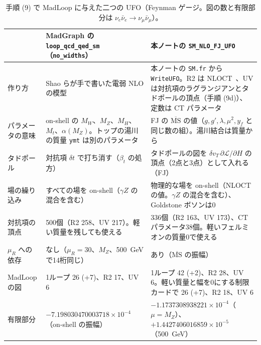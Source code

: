 \documentclass[a4paper,10pt]{ltjsarticle}
\newcommand{\MSbar}{\overline{\mathrm{MS}}}
\begin{document}
\begin{table}[tbp]
\centering\footnotesize
\caption{手順 (9) で MadLoop に与えた二つの UFO（Feynman ゲージ。図の数と有限部分は $\nu_e\bar\nu_e\to\nu_\mu\bar\nu_\mu$）。}
\label{tab:ufo}
\begin{tabularx}{\linewidth}{>{\raggedright\arraybackslash}p{2.3cm}>{\raggedright\arraybackslash}X>{\raggedright\arraybackslash}X}
\toprule
 & MadGraph の \texttt{loop\_qcd\_qed\_sm}（\texttt{no\_widths}） & 本ノートの \texttt{SM\_NLO\_FJ\_UFO} \\
\midrule
作り方 & Shao らが手で書いた電弱 NLO の模型~\cite{mg5ew} & 本ノートの \texttt{SM.fr} から \texttt{WriteUFO}。R2 は NLOCT~\cite{nloct}、UV は対抗項のラグランジアンとタドポールの頂点（手順 (9d)）、定数は CT パラメータ \\
パラメータの意味 & on-shell の $M_W$、$M_Z$、$M_H$、$M_t$、$\alpha(M_Z)$。トップの湯川の質量 \texttt{ymt} は別のパラメータ & FJ の $\MSbar$ の値（$g,g',\lambda,\mu^2,y_f$ と同じ数の組）。湯川結合は質量から \\
タドポール & 対抗項 $\delta t$ で打ち消す（$\beta_t$ の処方） & タドポールの図を $\delta v_T\,\partial\mathcal L/\partial H$ の頂点（2点と3点）として入れる（FJ） \\
場の繰り込み & すべての場を on-shell（$\gamma Z$ の混合を含む） & 物理的な場を on-shell（NLOCT の値。$\gamma Z$ の混合を含む）、Goldstone ボソンは0 \\
対抗項の頂点 & 500個（R2 258、UV 217）。軽い質量を残しても使える & 336個（R2 163、UV 173）、CT パラメータ38個。軽いフェルミオンの質量0で使える \\
$\mu_R$ への依存 & なし（$\mu_R=30$、$M_Z$、500~GeV で14桁同じ） & あり（$\MSbar$ の振幅） \\
MadLoop の図 & 1ループ 26 (+7)、R2 17、UV 6 & 1ループ 42 (+2)、R2 28、UV 6。軽い質量と幅を0にする制限カードで 26 (+7)、R2 18、UV 6 \\
有限部分 & $-7.198030470003718\times10^{-4}$（on-shell の振幅） & $-1.1737308938221\times10^{-4}$（$\mu=M_Z$）、$+1.4427406016859\times10^{-5}$（500~GeV） \\
\bottomrule
\end{tabularx}
\end{table}
\end{document}
